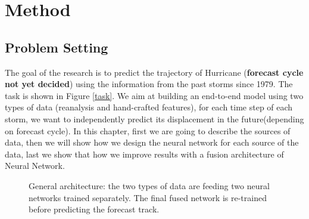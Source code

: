 

\chapter{Method}
\section{Problem Setting}


The goal of the research is to predict the trajectory of Hurricane (\textbf{forecast cycle not yet decided}) using the information from the past storms since 1979. The task is shown in Figure \ref{task}. We aim at building an end-to-end model using two types of data (reanalysis and hand-crafted features), for each time step of each storm, we want to independently predict its displacement in the future(depending on forecast cycle). In this chapter, first we are going to describe the sources of data,  then we will show how we design the neural network for each source of the data, last we show that how we improve results with a fusion architecture of Neural Network. 

\begin{figure}[H]
	\begin{center}
		\hsize {}
	\end{center}
	\caption{General architecture: the two types of data are feeding two neural networks trained separately. The final fused network is re-trained before predicting the forecast track. }
	\label{fig:task}
\end{figure}

